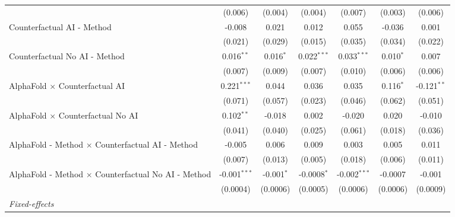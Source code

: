 \begin{tabular}{lcccccc}
                                                              & (0.006)        & (0.004)       & (0.004)       & (0.007)        & (0.003)       & (0.006)\\   
   Counterfactual AI - Method                                 & -0.008         & 0.021         & 0.012         & 0.055          & -0.036        & 0.001\\   
                                                              & (0.021)        & (0.029)       & (0.015)       & (0.035)        & (0.034)       & (0.022)\\   
   Counterfactual No AI - Method                              & 0.016$^{**}$   & 0.016$^{*}$   & 0.022$^{***}$ & 0.033$^{***}$  & 0.010$^{*}$   & 0.007\\   
                                                              & (0.007)        & (0.009)       & (0.007)       & (0.010)        & (0.006)       & (0.006)\\   
   AlphaFold $\times$ Counterfactual AI                       & 0.221$^{***}$  & 0.044         & 0.036         & 0.035          & 0.116$^{*}$   & -0.121$^{**}$\\   
                                                              & (0.071)        & (0.057)       & (0.023)       & (0.046)        & (0.062)       & (0.051)\\   
   AlphaFold $\times$ Counterfactual No AI                    & 0.102$^{**}$   & -0.018        & 0.002         & -0.020         & 0.020         & -0.010\\   
                                                              & (0.041)        & (0.040)       & (0.025)       & (0.061)        & (0.018)       & (0.036)\\   
   AlphaFold - Method $\times$ Counterfactual AI - Method     & -0.005         & 0.006         & 0.009         & 0.003          & 0.005         & 0.011\\   
                                                              & (0.007)        & (0.013)       & (0.005)       & (0.018)        & (0.006)       & (0.011)\\   
   AlphaFold - Method $\times$ Counterfactual No AI - Method  & -0.001$^{***}$ & -0.001$^{*}$  & -0.0008$^{*}$ & -0.002$^{***}$ & -0.0007       & -0.001\\   
                                                              & (0.0004)       & (0.0006)      & (0.0005)      & (0.0006)       & (0.0006)      & (0.0009)\\   
   \midrule
   \emph{Fixed-effects}\\

\end{tabular}
